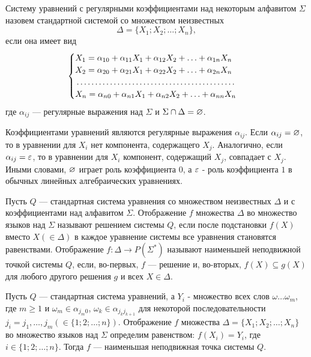 Систему уравнений с регулярными коэффициентами над некоторым алфавитом $\Sigma$ назовем стандартной системой со множеством неизвестных
\[
	\Delta = \{ X_1;X_2;\ldots ;X_n \},
\]
если она имеет вид
\begin{equation}
\label{GeneralSysWRegExprK}
\begin{cases}
X_{1} = \alpha_{10} + \alpha_{11}X_1 + \alpha_{12}X_2 + \ldots  + \alpha_{1n}X_n\\
X_{2} = \alpha_{20} + \alpha_{21}X_1 + \alpha_{22}X_2 + \ldots  + \alpha_{2n}X_n\\
\dotfill\\
X_n = \alpha_{n0} + \alpha_{n1}X_1 + \alpha_{n2}X_2 + \ldots  + \alpha_{nn}X_n
\end{cases}
\end{equation}
где $\alpha_{ij}$ --- регулярные выражения над $\Sigma$ и $\Sigma\cap\Delta=\varnothing$.

Коэффициентами уравнений являются регулярные выражения $\alpha_{ij}$. Если $\alpha_{ij}=\varnothing$, то в уравнении для $X_i$ нет компонента, содержащего $X_j$. Аналогично, если $\alpha_{ij}=\varepsilon$, то в уравнении для $X_i$ компонент, содержащий $X_j$, совпадает с $X_j$. Иными словами, $\varnothing$ играет роль коэффициента $0$, а $\varepsilon$ - роль коэффициента $1$ в обычных линейных алгебраических уравнениях.

Пусть $Q$ --- стандартная система уравнения со множеством неизвестных $\Delta$ и с коэффициентами над алфавитом $\Sigma$. Отображение $f$ множества $\Delta$ во множество языков над $\Sigma$ называют решением системы $Q$, если после подстановки $f(X)$ вместо $X(\in\Delta)$ в каждое уравнение системы все уравнения становятся равенствами. Отображение $f\colon \Delta\to P(\Sigma^*)$ называют наименьшей неподвижной точкой системы $Q$, если, во-первых, $f$ --- решение и, во-вторых, $f(X)\subseteq g(X)$ для любого другого решения $g$ и всех $X\in\Delta$.

\begin{mytheorem}
\label{theorem-NNTSysReg}
Пусть $Q$ --- стандартная система уравнений, а $Y_i$ - множество всех слов $\omega\ldots\omega_m$, где $m\ge 1$ и $\omega_m\in\alpha_{j_m0}$, $\omega_k\in\alpha_{j_kj_{k+1}}$ для некоторой последовательности $j_i=j_1, \ldots , j_m (\in\{1;2;\dots ;n\})$. Отображение $f$ множества $\Delta=\{X_1;X_2;\ldots ;X_n\}$ во множество языков над $\Sigma$ определим равенством: $f(X_i)=Y_i$, где $i\in\{1;2;\ldots ;n\}$. Тогда $f$ --- наименьшая неподвижная точка системы $Q$.
\end{mytheorem}


